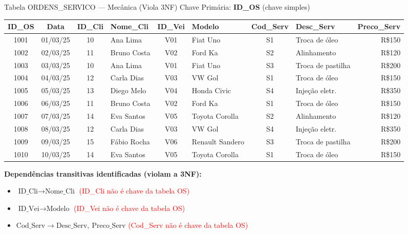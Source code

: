 \documentclass[9pt]{beamer}
\begin{document}
\begin{frame}{Tabela ORDENS\_SERVICO — Mecânica (Viola 3NF)}
\tiny
Chave Primária: \textbf{ID\_OS} \quad (chave simples)
\vspace{0.1cm}
\centering
\begin{tabular}{|c|c|c|l|c|l|c|l|r|}
  \hline
  \textbf{ID\_OS} & \textbf{Data} & \textbf{ID\_Cli} & \textbf{Nome\_Cli} & \textbf{ID\_Vei} & \textbf{Modelo} & \textbf{Cod\_Serv} & \textbf{Desc\_Serv} & \textbf{Preco\_Serv} \\ \hline
  1001 & 01/03/25 & 10 & Ana Lima     & V01 & \color{red}Fiat Uno       & S1 & \color{red}Troca de óleo     & \color{red}R\$150 \\ \hline
  1002 & 02/03/25 & 11 & Bruno Costa  & V02 & \color{red}Ford Ka        & S2 & \color{red}Alinhamento       & \color{red}R\$120 \\ \hline
  1003 & 03/03/25 & 10 & Ana Lima     & V01 & \color{red}Fiat Uno       & S3 & \color{red}Troca de pastilha & \color{red}R\$200 \\ \hline
  1004 & 04/03/25 & 12 & Carla Dias   & V03 & \color{red}VW Gol         & S1 & \color{red}Troca de óleo     & \color{red}R\$150 \\ \hline
  1005 & 05/03/25 & 13 & Diego Melo   & V04 & \color{red}Honda Civic    & S4 & \color{red}Injeção eletr.    & \color{red}R\$350 \\ \hline
  1006 & 06/03/25 & 11 & Bruno Costa  & V02 & \color{red}Ford Ka        & S1 & \color{red}Troca de óleo     & \color{red}R\$150 \\ \hline
  1007 & 07/03/25 & 14 & Eva Santos   & V05 & \color{red}Toyota Corolla & S2 & \color{red}Alinhamento       & \color{red}R\$120 \\ \hline
  1008 & 08/03/25 & 12 & Carla Dias   & V03 & \color{red}VW Gol         & S4 & \color{red}Injeção eletr.    & \color{red}R\$350 \\ \hline
  1009 & 09/03/25 & 15 & Fábio Rocha  & V06 & \color{red}Renault Sandero& S3 & \color{red}Troca de pastilha & \color{red}R\$200 \\ \hline
  1010 & 10/03/25 & 14 & Eva Santos   & V05 & \color{red}Toyota Corolla & S1 & \color{red}Troca de óleo     & \color{red}R\$150 \\ \hline
\end{tabular}

\vspace{0.15cm}
\flushleft
\textbf{Dependências transitivas identificadas (violam a 3NF):}
\begin{itemize}
  \item $\text{ID\_Cli} \to \text{Nome\_Cli}$ \quad \textcolor{red}{(ID\_Cli não é chave da tabela OS)}
  \item $\text{ID\_Vei} \to \text{Modelo}$ \quad \textcolor{red}{(ID\_Vei não é chave da tabela OS)}
  \item $\text{Cod\_Serv} \to \text{Desc\_Serv},\ \text{Preco\_Serv}$ \quad \textcolor{red}{(Cod\_Serv não é chave da tabela OS)}
\end{itemize}
\end{frame}
\end{document}
